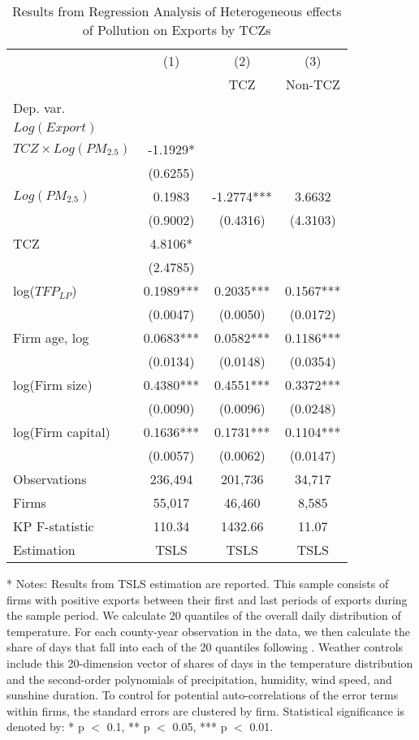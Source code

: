 \documentclass[12pt]{article}
\begin{document}
  \begin{table}[H]\centering
    \caption{Results from Regression Analysis of Heterogeneous effects of Pollution on Exports by TCZs} \label{tab:hetero_cost}
    \begin{tabular}{l*{3}{c}}
      \hline\hline
      &\multicolumn{1}{c}{(1)}&\multicolumn{1}{c}{(2)}&\multicolumn{1}{c}{(3)}\\
      &\multicolumn{1}{c}{}&\multicolumn{1}{c}{TCZ}&\multicolumn{1}{c}{Non-TCZ}\\
      Dep. var. &&&\\
      $Log(Export)$ &&&\\
      \hline
      $TCZ \times Log(PM_{2.5})$ &-1.1929* &&\\
                                &(0.6255)&&\\
      $Log(PM_{2.5})$ &0.1983&-1.2774***&3.6632\\
                      &(0.9002)&(0.4316)&(4.3103)\\
      TCZ &4.8106*&&\\
          &(2.4785)&&\\
      log($TFP_{LP}$) &0.1989***&0.2035***&0.1567***\\
                      &(0.0047)&(0.0050)&(0.0172)\\
      Firm age, log &0.0683***&0.0582***&0.1186***\\
                    &(0.0134)&(0.0148)&(0.0354)\\
      log(Firm size) &0.4380***&0.4551***&0.3372***\\
                    &(0.0090)&(0.0096)&(0.0248)\\
      log(Firm capital) &0.1636***&0.1731***&0.1104***\\
                    &(0.0057)&(0.0062)&(0.0147)\\
      \hline
      Observations	&236,494	&201,736	&34,717 \\
      Firms	&55,017	&46,460	&8,585 \\
      KP F-statistic	&110.34	&1432.66	&11.07 \\
      Estimation      &TSLS&TSLS&TSLS\\
      \hline\hline
  \end{tabular}
  \begin{tablenotes}
    \item[*] \small Notes: Results from TSLS estimation are reported. This sample consists of firms with positive exports between their first and last periods of exports during the sample period. We calculate 20 quantiles of the overall daily distribution of temperature. For each county-year observation in the data, we then calculate the share of days that fall into each of the 20 quantiles following \citep{deschenes2017defensive}. Weather controls include this 20-dimension vector of shares of days in the temperature distribution and the second-order polynomials of precipitation, humidity, wind speed, and sunshine duration. To control for potential auto-correlations of the error terms within firms, the standard errors are clustered by firm. Statistical significance is denoted by: * p $<$ 0.1, ** p $<$ 0.05, *** p $<$ 0.01.

\end{tablenotes}
\end{table}
\end{document}
